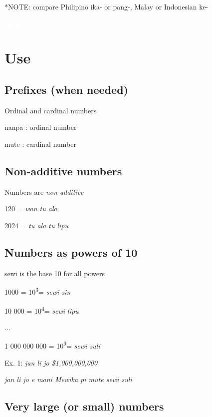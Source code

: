 \documentclass{article}
\begin{document}
\vspace{5pt}	

	*NOTE: compare Philipino ika- or pang-, Malay or Indonesian ke-

\newpage

\textcolor{white}{easily}

\section{Use}
	
\subsection{Prefixes (when needed)}

    Ordinal and cardinal numbers
	
	nanpa {}:  ordinal number
	
	mute {}: cardinal number
	
	\hypertarget{non-additive-numbers}{%
		\subsection{Non-additive numbers}\label{non-additive-numbers}}
	
	Numbers are \emph{non-additive}
	
	120 = \emph{wan tu ala}
	
	2024 = \emph{tu ala tu lipu}
	
    \subsection{Numbers as powers of 10}
    
    sewi is the base 10 for all powers
	
	1000 = 10\textsuperscript{3}= \emph{sewi sin}
	
	10 000 = 10\textsuperscript{4}= \emph{sewi lipu}
	
	...
	
	1 000 000 000 = 10\textsuperscript{9}= \emph{sewi suli}
	
\vspace {12 pt}
	
	Ex. 1: \emph{jan li jo \$1,000,000,000}
	
	\emph{jan li jo e mani Mewika pi mute sewi suli}
	
\subsection{Very large (or small) numbers}
\end{document}
